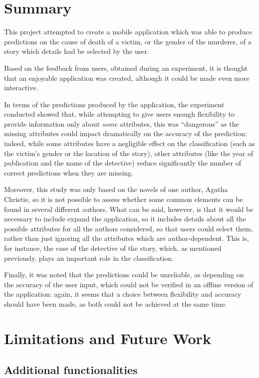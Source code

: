 \documentclass{mproj}
\begin{document}
\section{Summary}

This project attempted to create a mobile application which was able to produce predictions on the cause of death of a victim, or the gender of the murderer, of a story which details had be selected by the user.

Based on the feedback from users, obtained during an experiment, it is thought that an enjoyable application was created, although it could be made even more interactive.

In terms of the predictions produced by the application, the experiment conducted showed that, while attempting to give users enough flexibility to provide information only about \textit{some} attributes, this was ``dangerous'' as the missing attributes could impact dramatically on the accuracy of the prediction: indeed, while some attributes have a negligible effect on the classification (such as the victim's gender or the location of the story), other attributes (like the year of publication and the name of the detective) reduce significantly the number of correct predictions when they are missing.

Moreover, this study was only based on the novels of one author, Agatha Christie, so it is not possible to assess whether some common elements can be found in several different authors. What can be said, however, is that it would be necessary to include expand the application, so it includes details about all the possible attributes for all the authors considered, so that users could select them, rather than just ignoring all the attributes which are author-dependent. This is, for instance, the case of the detective of the story, which, as mentioned previously, plays an important role in the classification.

Finally, it was noted that the predictions could be unreliable, as depending on the accuracy of the user input, which could not be verified in an offline version of the application: again, it seems that a choice between flexibility and accuracy should have been made, as both could not be achieved at the same time.

\section{Limitations and Future Work}

\subsection*{Additional functionalities}
\end{document}
